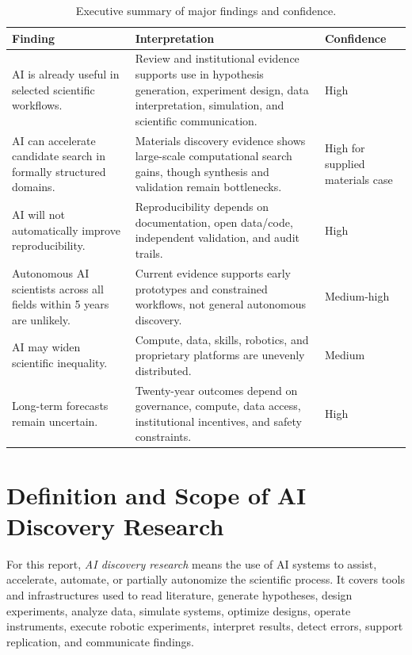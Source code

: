 \documentclass[12pt]{article}
\begin{document}
\begin{table}[H]
\centering
\caption{Executive summary of major findings and confidence.}
\small
\begin{tabularx}{\textwidth}{p{3.7cm}X p{2.3cm}}
\toprule
\textbf{Finding} & \textbf{Interpretation} & \textbf{Confidence} \\
\midrule
AI is already useful in selected scientific workflows. & Review and institutional evidence supports use in hypothesis generation, experiment design, data interpretation, simulation, and scientific communication. & High \\
AI can accelerate candidate search in formally structured domains. & Materials discovery evidence shows large-scale computational search gains, though synthesis and validation remain bottlenecks. & High for supplied materials case \\
AI will not automatically improve reproducibility. & Reproducibility depends on documentation, open data/code, independent validation, and audit trails. & High \\
Autonomous AI scientists across all fields within 5 years are unlikely. & Current evidence supports early prototypes and constrained workflows, not general autonomous discovery. & Medium-high \\
AI may widen scientific inequality. & Compute, data, skills, robotics, and proprietary platforms are unevenly distributed. & Medium \\
Long-term forecasts remain uncertain. & Twenty-year outcomes depend on governance, compute, data access, institutional incentives, and safety constraints. & High \\
\bottomrule
\end{tabularx}
\end{table}

\section{Definition and Scope of AI Discovery Research}

For this report, \textit{AI discovery research} means the use of AI systems to assist, accelerate, automate, or partially autonomize the scientific process. It covers tools and infrastructures used to read literature, generate hypotheses, design experiments, analyze data, simulate systems, optimize designs, operate instruments, execute robotic experiments, interpret results, detect errors, support replication, and communicate findings.
\end{document}
